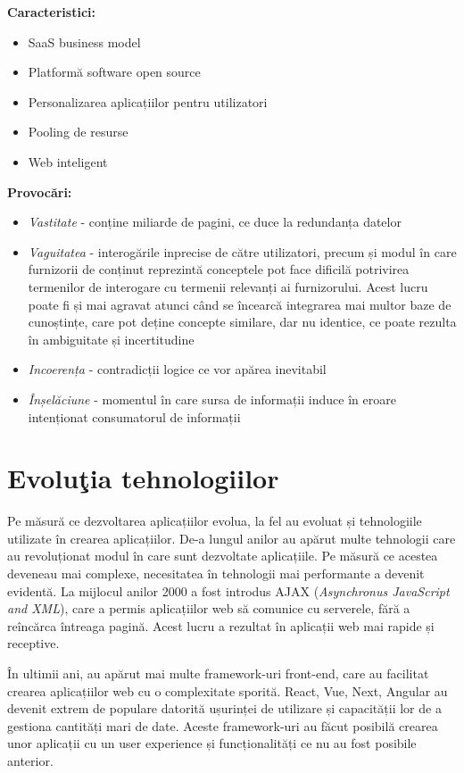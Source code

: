 \documentclass[12pt, a4paper]{report}
\begin{document}
\textbf{Caracteristici:}
\begin{itemize}
	\item SaaS business model
	\item Platformă software open source
	\item Personalizarea aplicațiilor pentru utilizatori
	\item Pooling de resurse
	\item Web inteligent
\end{itemize}


\textbf{Provocări:}
\begin{itemize}
	\item \emph{Vastitate} - conține miliarde de pagini, ce duce la redundanța datelor
	\item \emph{Vaguitatea} - interogările inprecise de către utilizatori, precum și modul în care furnizorii de conținut reprezintă conceptele pot face dificilă potrivirea termenilor de interogare cu termenii relevanți ai furnizorului. Acest lucru poate fi și mai agravat atunci când se încearcă integrarea mai multor baze de cunoștințe, care pot deține concepte similare, dar nu identice, ce poate rezulta în ambiguitate și incertitudine
	\item \emph{Incoerența} - contradicții logice ce vor apărea inevitabil
	\item \emph{Înșelăciune} - momentul în care sursa de informații induce în eroare intenționat consumatorul de informații
\end{itemize}

\section{Evolu\c tia tehnologiilor}

Pe măsură ce dezvoltarea aplicațiilor evolua, la fel au evoluat și tehnologiile utilizate în crearea aplicațiilor. De-a lungul anilor au apărut multe tehnologii care au revoluționat modul în care sunt dezvoltate aplicațiile. Pe măsură ce acestea deveneau mai complexe, necesitatea în tehnologii mai performante a devenit evidentă. La mijlocul anilor 2000 a fost introdus AJAX (\emph{Asynchronus JavaScript and XML}), care a permis aplicațiilor web să comunice cu serverele, fără a reîncărca întreaga pagină. Acest lucru a rezultat în aplicații web mai rapide și receptive.

În ultimii ani, au apărut mai multe framework-uri front-end, care au facilitat crearea aplicațiilor web cu o complexitate sporită. React, Vue, Next, Angular au devenit extrem de populare datorită ușurinței de utilizare și capacității lor de a gestiona cantități mari de date. Aceste framework-uri au făcut posibilă crearea unor aplicații cu un user experience și funcționalități ce nu au fost posibile anterior.
\end{document}
